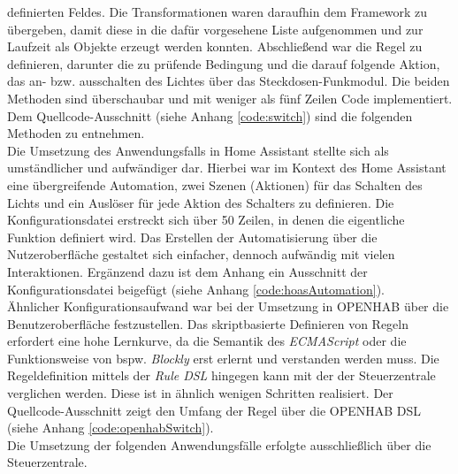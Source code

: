     definierten Feldes. Die Transformationen waren daraufhin dem Framework zu übergeben, damit diese in die dafür vorgesehene Liste aufgenommen und zur Laufzeit als Objekte 
    erzeugt werden konnten. Abschließend war die Regel zu definieren, darunter die zu prüfende Bedingung und die darauf folgende Aktion, das an- bzw. ausschalten des Lichtes über das 
    Steckdosen-Funkmodul. Die beiden Methoden sind überschaubar und mit weniger als fünf Zeilen Code implementiert. Dem Quellcode-Ausschnitt (siehe Anhang \ref{code:switch}) 
    sind die folgenden Methoden zu entnehmen.
    \\
    Die Umsetzung des Anwendungsfalls in Home Assistant stellte sich als umständlicher und aufwändiger dar. Hierbei war im Kontext des Home Assistant 
    eine übergreifende Automation, zwei Szenen (Aktionen) für das Schalten des Lichts und ein Auslöser für jede Aktion des Schalters zu definieren. Die Konfigurationsdatei 
    erstreckt sich über 50 Zeilen, in denen die eigentliche Funktion definiert wird. Das Erstellen der Automatisierung über die Nutzeroberfläche gestaltet sich einfacher, dennoch 
    aufwändig mit vielen Interaktionen. Ergänzend dazu ist dem Anhang ein Ausschnitt der Konfigurationsdatei beigefügt (siehe Anhang \ref{code:hoasAutomation}).
    \\
    \linebreak
    Ähnlicher Konfigurationsaufwand war bei der Umsetzung in \acs{OPENHAB} über die Benutzeroberfläche festzustellen. Das skriptbasierte Definieren von Regeln erfordert eine 
    hohe Lernkurve, da die Semantik  des \textit{ECMAScript} oder die Funktionsweise von bspw. \textit{Blockly} erst erlernt und verstanden werden muss. Die Regeldefinition 
    mittels der \textit{Rule \acs{DSL}} hingegen kann mit der der Steuerzentrale verglichen werden. Diese ist in ähnlich wenigen Schritten realisiert. Der 
    Quellcode-Ausschnitt zeigt den Umfang der Regel über die \acs{OPENHAB} \acs{DSL} (siehe Anhang \ref{code:openhabSwitch}). 
    \\
    \linebreak
    Die Umsetzung der folgenden Anwendungsfälle erfolgte ausschließlich über die Steuerzentrale.

